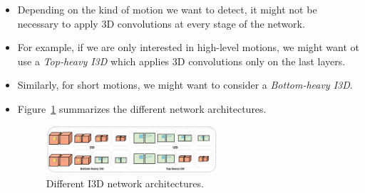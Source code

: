 \begin{enumerate}
\begin{itemize}
		\item Depending on the kind of motion we want to detect, it might not be necessary to apply 3D convolutions at every stage of the network. 
		\item For example, if we are only interested in high-level motions, we might want ot use a \textit{Top-heavy I3D} which applies 3D convolutions only on the last layers. 
		\item Similarly, for short motions, we might want to consider a \textit{Bottom-heavy I3D}. 
		\item Figure~\ref{fig:deep_video_I3D_architectures} summarizes the different network architectures.
		\begin{figure}[ht!]
			\centering
			\includegraphics[width=0.6\textwidth]{figures/cv_deep_video_different_I3D_architectures.png}
			\caption{Different I3D network architectures.}
			\label{fig:deep_video_I3D_architectures}
		\end{figure}
	\end{itemize}
\end{enumerate}
